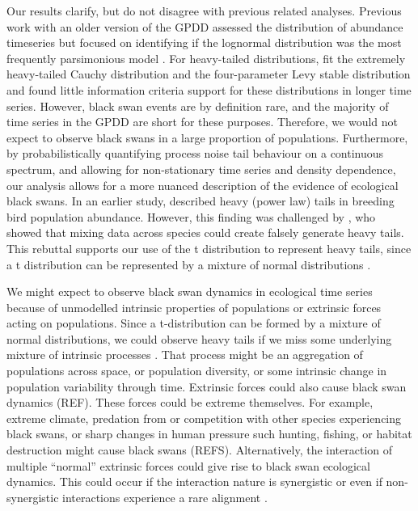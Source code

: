 Our results clarify, but do not disagree with previous related analyses.
Previous work with an older version of the GPDD assessed the distribution of
abundance timeseries but focused on identifying if the lognormal distribution
was the most frequently parsimonious model \citep{halley2002}. For heavy-tailed
distributions, \citet{halley2002} fit the extremely heavy-tailed Cauchy
distribution and the four-parameter Levy stable distribution and found little
information criteria support for these distributions in longer time series.
However, black swan events are by definition rare, and the majority of time
series in the GPDD are short for these purposes. Therefore, we would not expect
to observe black swans in a large proportion of populations. Furthermore, by
probabilistically quantifying process noise tail behaviour on a continuous
spectrum, and allowing for non-stationary time series and density dependence,
our analysis allows for a more nuanced description of the evidence of
ecological black swans. In an earlier study, \citet{keitt1998} described heavy
(power law) tails in breeding bird population abundance. However, this finding
was challenged by \citet{allen2001}, who showed that mixing data across species
could create falsely generate heavy tails. This rebuttal supports our use of
the t distribution to represent heavy tails, since a t distribution can be
represented by a mixture of normal distributions \citep[with
inverse-gamma-distributed variances,][]{gelman2014}.

We might expect to observe black swan dynamics in ecological time series
because of unmodelled intrinsic properties of populations or extrinsic forces
acting on populations. Since a t-distribution can be formed by a mixture of
normal distributions, we could observe heavy tails if we miss some underlying
mixture of intrinsic processes \citep{allen2001}. That process might be an
aggregation of populations across space, or population diversity, or some
intrinsic change in population variability through time. Extrinsic forces could
also cause black swan dynamics (REF). These forces could be extreme themselves.
For example, extreme climate, predation from or competition with other species
experiencing black swans, or sharp changes in human pressure such hunting,
fishing, or habitat destruction might cause black swans (REFS). Alternatively,
the interaction of multiple ``normal'' extrinsic forces could give rise to
black swan ecological dynamics. This could occur if the interaction nature is
synergistic \citep[e.g.][]{kirby2009} or even if non-synergistic interactions
experience a rare alignment \citep{denny2009}.


